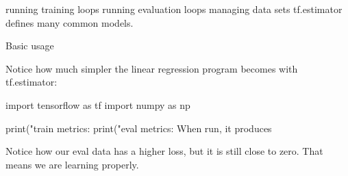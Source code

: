 \documentclass[10pt,a4paper]{ctexbook}
\begin{document}
running training loops
running evaluation loops
managing data sets
tf.estimator defines many common models.

Basic usage

Notice how much simpler the linear regression program becomes with tf.estimator:

import tensorflow as tf
import numpy as np





print("train metrics: %
print("eval metrics: %
When run, it produces

Notice how our eval data has a higher loss, but it is still close to zero. That means we are learning properly.
\end{document}
